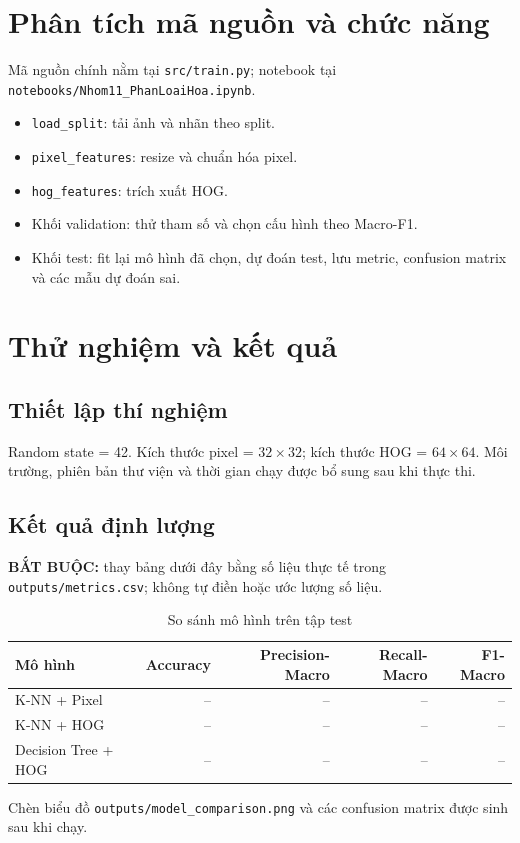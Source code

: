 \documentclass[12pt,a4paper]{report}
\begin{document}
\chapter{Phân tích mã nguồn và chức năng}
Mã nguồn chính nằm tại \texttt{src/train.py}; notebook tại \texttt{notebooks/Nhom11\_PhanLoaiHoa.ipynb}.
\begin{itemize}
\item \texttt{load\_split}: tải ảnh và nhãn theo split.
\item \texttt{pixel\_features}: resize và chuẩn hóa pixel.
\item \texttt{hog\_features}: trích xuất HOG.
\item Khối validation: thử tham số và chọn cấu hình theo Macro-F1.
\item Khối test: fit lại mô hình đã chọn, dự đoán test, lưu metric, confusion matrix và các mẫu dự đoán sai.
\end{itemize}

\chapter{Thử nghiệm và kết quả}
\section{Thiết lập thí nghiệm}
Random state = 42. Kích thước pixel = $32\times32$; kích thước HOG = $64\times64$. Môi trường, phiên bản thư viện và thời gian chạy được bổ sung sau khi thực thi.

\section{Kết quả định lượng}
\textbf{BẮT BUỘC:} thay bảng dưới đây bằng số liệu thực tế trong \texttt{outputs/metrics.csv}; không tự điền hoặc ước lượng số liệu.
\begin{table}[H]\centering
\caption{So sánh mô hình trên tập test}
\begin{tabular}{lrrrr}\toprule
Mô hình & Accuracy & Precision-Macro & Recall-Macro & F1-Macro\\\midrule
K-NN + Pixel & -- & -- & -- & --\\
K-NN + HOG & -- & -- & -- & --\\
Decision Tree + HOG & -- & -- & -- & --\\\bottomrule
\end{tabular}
\end{table}
Chèn biểu đồ \texttt{outputs/model\_comparison.png} và các confusion matrix được sinh sau khi chạy.
\end{document}

